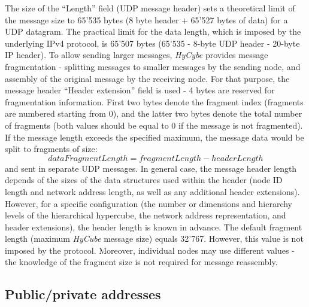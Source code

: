 The size of the ``Length'' field (UDP message header) sets a theoretical limit of the message size to 65'535 bytes (8 byte header + 65'527 bytes of data) for a UDP datagram. The practical limit for the data length, which is imposed by the underlying IPv4 protocol, is 65'507 bytes (65'535 - 8-byte UDP header - 20-byte IP header). To allow sending larger messages, \emph{HyCybe} provides message fragmentation - splitting messages to smaller messages by the sending node, and assembly of the original message by the receiving node. For that purpose, the message header ``Header extension'' field is used - 4 bytes are reserved for fragmentation information. First two bytes denote the fragment index (fragments are numbered starting from 0), and the latter two bytes denote the total number of fragments (both values should be equal to 0 if the message is not fragmented). If the message length exceeds the specified maximum, the message data would be split to fragments of size: $$dataFragmentLength = fragmentLength - headerLength$$ and sent in separate UDP messages. In general case, the message header length depends of the sizes of the data structures used within the header (node ID length and network address length, as well as any additional header extensions). However, for a specific configuration (the number or dimensions and hierarchy levels of the hierarchical hypercube, the network address representation, and header extensions), the header length is known in advance. The default fragment length (maximum \emph{HyCube} message size) equals 32'767. However, this value is not imposed by the protocol. Moreover, individual nodes may use different values - the knowledge of the fragment size is not required for message reassembly.




\subsection{Public/private addresses}

